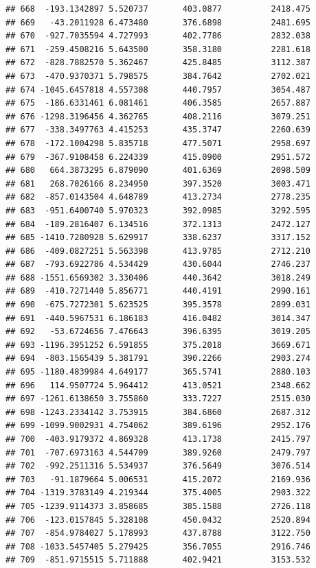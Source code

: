 \documentclass[
]{article}
\begin{document}
\begin{verbatim}
## 668  -193.1342897 5.520737       403.0877          2418.475
## 669   -43.2011928 6.473480       376.6898          2481.695
## 670  -927.7035594 4.727993       402.7786          2832.038
## 671  -259.4508216 5.643500       358.3180          2281.618
## 672  -828.7882570 5.362467       425.8485          3112.387
## 673  -470.9370371 5.798575       384.7642          2702.021
## 674 -1045.6457818 4.557308       440.7957          3054.487
## 675  -186.6331461 6.081461       406.3585          2657.887
## 676 -1298.3196456 4.362765       408.2116          3079.251
## 677  -338.3497763 4.415253       435.3747          2260.639
## 678  -172.1004298 5.835718       477.5071          2958.697
## 679  -367.9108458 6.224339       415.0900          2951.572
## 680   664.3873295 6.879090       401.6369          2098.509
## 681   268.7026166 8.234950       397.3520          3003.471
## 682  -857.0143504 4.648789       413.2734          2778.235
## 683  -951.6400740 5.970323       392.0985          3292.595
## 684  -189.2816407 6.134516       372.1313          2472.127
## 685 -1410.7280928 5.629917       338.6237          3317.152
## 686  -409.0827251 5.563398       413.9785          2712.210
## 687  -793.6922786 4.534429       430.6044          2746.237
## 688 -1551.6569302 3.330406       440.3642          3018.249
## 689  -410.7271440 5.856771       440.4191          2990.161
## 690  -675.7272301 5.623525       395.3578          2899.031
## 691  -440.5967531 6.186183       416.0482          3014.347
## 692   -53.6724656 7.476643       396.6395          3019.205
## 693 -1196.3951252 6.591855       375.2018          3669.671
## 694  -803.1565439 5.381791       390.2266          2903.274
## 695 -1180.4839984 4.649177       365.5741          2880.103
## 696   114.9507724 5.964412       413.0521          2348.662
## 697 -1261.6138650 3.755860       333.7227          2515.030
## 698 -1243.2334142 3.753915       384.6860          2687.312
## 699 -1099.9002931 4.754062       389.6196          2952.176
## 700  -403.9179372 4.869328       413.1738          2415.797
## 701  -707.6973163 4.544709       389.9260          2479.797
## 702  -992.2511316 5.534937       376.5649          3076.514
## 703   -91.1879664 5.006531       415.2072          2169.936
## 704 -1319.3783149 4.219344       375.4005          2903.322
## 705 -1239.9114373 3.858685       385.1588          2726.118
## 706  -123.0157845 5.328108       450.0432          2520.894
## 707  -854.9784027 5.178993       437.8788          3122.750
## 708 -1033.5457405 5.279425       356.7055          2916.746
## 709  -851.9715515 5.711888       402.9421          3153.532

\end{verbatim}
\end{document}
